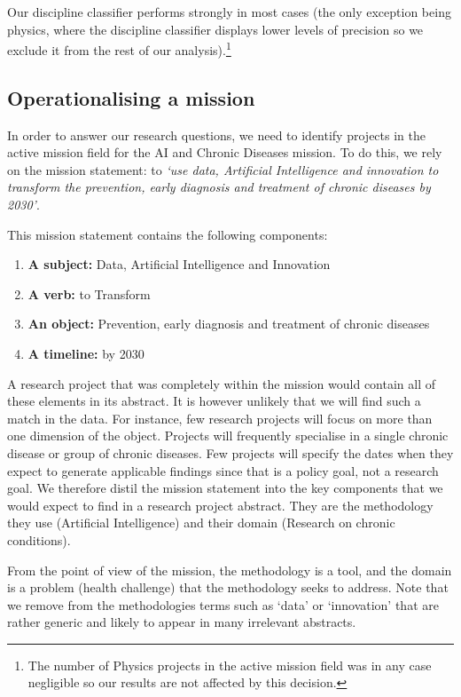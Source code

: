 \documentclass[11pt]{article}
\begin{document}
Our discipline classifier performs strongly in most cases (the only exception being physics, where the discipline classifier displays lower levels of precision so we exclude it from the rest of our analysis).\footnote{The number of Physics projects in the active mission field was in any case negligible so our results are not affected by this decision.}

\subsection{Operationalising a mission}
In order to answer our research questions, we need to identify projects in the active mission field for the AI and Chronic Diseases mission. To do this, we rely on the mission statement: to \textit{`use data, Artificial Intelligence and innovation to transform the prevention, early
diagnosis and treatment of chronic diseases by 2030'}. 

This mission statement contains the following components:

\begin{enumerate}
    \item \textbf{A subject:} Data, Artificial Intelligence and Innovation
    \item \textbf{A verb:} to Transform
    \item \textbf{An object:} Prevention, early diagnosis and treatment of chronic diseases
    \item \textbf{A timeline:} by 2030
\end{enumerate}

A research project that was completely within the mission would contain all of these elements in its abstract. It is however unlikely that we will find such a match in the data. For instance, few research projects will focus on more than one dimension of the object. Projects will frequently specialise in a single chronic disease or group of chronic diseases. Few projects will specify the dates when they expect to generate applicable findings since that is a policy goal, not a research goal.  We therefore distil the mission statement into the key components that
we would expect to find in a research project abstract. They are the methodology they use (Artificial Intelligence) and their domain (Research on chronic conditions). 

From the point of view of the mission, the methodology is a tool, and the domain is a problem (health challenge) that the methodology seeks to address. Note that we remove from the methodologies terms such as ‘data’ or ‘innovation’ that are rather generic and likely to appear in many irrelevant abstracts. 
\end{document}

